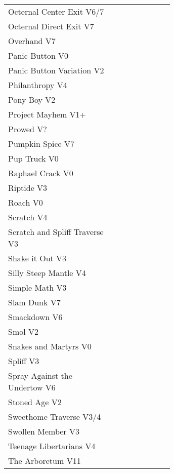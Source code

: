 \begin{flushleft}
\begin{center}
\begin{supertabular}{p{0.65\linewidth}r}
Octernal Center Exit V6/7 & \pageref{vr:Octernal Center Exit} \\
Octernal Direct Exit V7 & \pageref{vr:Octernal Direct Exit} \\
Overhand V7 & \pageref{rt:Overhand} \\
Panic Button V0 & \pageref{rt:Panic Button} \\
Panic Button Variation V2 & \pageref{vr:Panic Button Variation} \\
Philanthropy V4 & \pageref{rt:Philanthropy} \\
Pony Boy V2 & \pageref{rt:Pony Boy} \\
Project Mayhem V1+ & \pageref{rt:Project Mayhem} \\
Prowed V? & \pageref{vr:Prowed} \\
Pumpkin Spice V7 & \pageref{rt:Pumpkin Spice} \\
Pup Truck V0 & \pageref{rt:Pup Truck} \\
Raphael Crack V0 & \pageref{rt:Raphael Crack} \\
Riptide V3 & \pageref{rt:Riptide} \\
Roach V0 & \pageref{rt:Roach} \\
Scratch V4 & \pageref{rt:Scratch} \\
Scratch and Spliff Traverse V3 & \pageref{rt:Scratch and Spliff Traverse} \\
Shake it Out V3 & \pageref{vr:Shake it Out} \\
Silly Steep Mantle V4 & \pageref{rt:Silly Steep Mantle} \\
Simple Math V3 & \pageref{rt:Simple Math} \\
Slam Dunk V7 & \pageref{rt:Slam Dunk} \\
Smackdown V6 & \pageref{rt:Smackdown} \\
Smol V2 & \pageref{rt:Smol} \\
Snakes and Martyrs V0 & \pageref{rt:Snakes and Martyrs} \\
Spliff V3 & \pageref{rt:Spliff} \\
Spray Against the Undertow V6 & \pageref{vr:Spray Against the Undertow} \\
Stoned Age V2 & \pageref{rt:Stoned Age} \\
Sweethome Traverse V3/4 & \pageref{vr:Sweethome Traverse} \\
Swollen Member V3 & \pageref{rt:Swollen Member} \\
Teenage Libertarians V4 & \pageref{rt:Teenage Libertarians} \\
The Arboretum V11 & \pageref{rt:The Arboretum} \\

\end{supertabular}
\end{center}
\end{flushleft}

